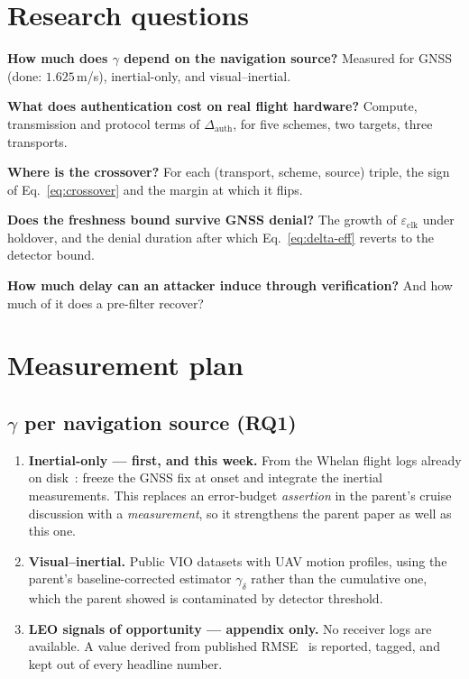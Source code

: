 \documentclass[11pt,a4paper]{article}
\newcommand{\Dauth}{\Delta_{\mathrm{auth}}}
\newcommand{\eclk}{\varepsilon_{\mathrm{clk}}}
\begin{document}
\section{Research questions}
\begin{description}[leftmargin=2.6em,style=nextline]
\item[RQ1] \textbf{How much does $\gamma$ depend on the navigation source?}
  Measured for GNSS (done: $1.625$\,m/s), inertial-only, and visual--inertial.
\item[RQ2] \textbf{What does authentication cost on real flight hardware?}
  Compute, transmission and protocol terms of $\Dauth$, for five schemes, two
  targets, three transports.
\item[RQ3] \textbf{Where is the crossover?} For each (transport, scheme,
  source) triple, the sign of Eq.~\eqref{eq:crossover} and the margin at which it
  flips.
\item[RQ4] \textbf{Does the freshness bound survive GNSS denial?} The growth of
  $\eclk$ under holdover, and the denial duration after which
  Eq.~\eqref{eq:delta-eff} reverts to the detector bound.
\item[RQ5] \textbf{How much delay can an attacker induce through
  verification?} And how much of it does a pre-filter recover?
\end{description}

\section{Measurement plan}
\label{sec:measure}
\subsection{$\gamma$ per navigation source (RQ1)}
\begin{enumerate}
\item \textbf{Inertial-only --- first, and this week.} From the Whelan flight
  logs already on disk~\cite{whelan2020uav}: freeze the GNSS fix at onset and
  integrate the inertial measurements. This replaces an error-budget
  \emph{assertion} in the parent's cruise discussion with a \emph{measurement},
  so it strengthens the parent paper as well as this one.
\item \textbf{Visual--inertial.} Public VIO datasets with UAV motion profiles,
  using the parent's baseline-corrected estimator $\gamma_\delta$ rather than the
  cumulative one, which the parent showed is contaminated by detector
  threshold.
\item \textbf{LEO signals of opportunity --- appendix only.} No receiver logs
  are available. A  value derived from published
  RMSE~\cite{kassas2021leodoppler,kassas2022jammer} is reported, tagged, and kept
  out of every headline number.
\end{enumerate}
\end{document}

